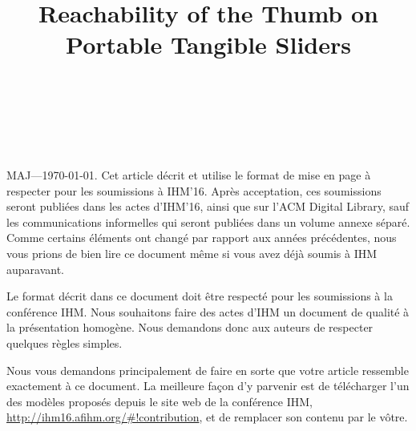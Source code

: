 \documentclass{sigchi}
\def\plaintitle{Reachability of the Thumb on Portable Tangible Sliders}
\begin{document}
\title{\plaintitle}

\author{%
  \\
  \\
  \\
}


\maketitle


\begin{resume} %
	MAJ---\today. Cet article d\'{e}crit et utilise le format de mise en page \`{a} respecter pour les soumissions \`{a} IHM'16. Apr\`{e}s acceptation, ces soumissions seront publi\'{e}es dans les actes d'IHM'16, ainsi que sur l'ACM Digital Library, sauf les communications informelles qui seront publi\'{e}es dans un volume annexe s\'{e}par\'{e}. Comme certains \'el\'ements ont chang\'{e} par rapport aux ann\'{e}es pr\'{e}c\'{e}dentes, nous vous prions de bien lire ce document m\^{e}me si vous avez d\'{e}j\`{a} soumis \`{a} IHM auparavant.
	  
  Le format d\'{e}crit dans ce document doit \^{e}tre respect\'{e} pour les soumissions \`{a} la conf\'{e}rence IHM. Nous souhaitons faire des actes d'IHM un document de qualit\'{e} \`{a} la pr\'{e}sentation homog\`{e}ne. Nous demandons donc aux auteurs de respecter quelques r\`{e}gles simples. 
  
  Nous vous demandons principalement de faire en sorte que votre article ressemble exactement \`{a} ce document. La meilleure fa\c{c}on d'y parvenir est de t\'{e}l\'{e}charger l'un des mod\`{e}les propos\'{e}s depuis le site web de la conf\'{e}rence IHM, \url{http://ihm16.afihm.org/#!contribution}, et de remplacer son contenu par le v\^otre.
\end{resume}
\end{document}
